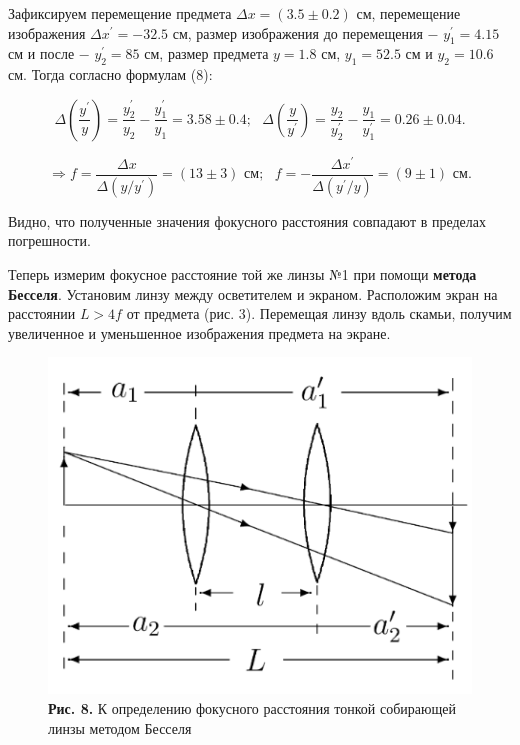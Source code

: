 \documentclass[a4paper,12pt]{article} %
\begin{document}
\hfill \break Зафиксируем перемещение предмета $\Delta x = (3.5 \pm 0.2)$ см, перемещение изображения $\Delta x^\prime = -32.5$ см, размер изображения до перемещения $-$ $y_{1}^\prime = 4.15$ см и после $-$ $y_{2}^\prime = 85$ см, размер предмета $y = 1.8$ см, $y_{1} = 52.5$ см и $y_{2} = 10.6$ см. Тогда согласно формулам (8):

$$
\Delta \left( \frac{y^\prime}{y} \right) = \frac{y_{2}^\prime}{y_{2}} - \frac {y_{1}^\prime} {y_{1}} = 3.58 \pm 0.4; \text{ } \Delta \left( \frac{y}{y^\prime} \right) = \frac{y_{2}}{y_{2}^\prime} - \frac {y_{1}} {y_{1}^\prime} = 0.26 \pm 0.04.
$$

\begin{equation}\label{ linkname }
\Rightarrow f = \frac {\Delta x} {\Delta \left( y / y^\prime \right)} = (13 \pm 3) \text{ см}; \text{ } f = - \frac {\Delta x^\prime} {\Delta \left( y^\prime / y \right)} = (9 \pm 1) \text{ см}.
\end{equation}
 
\hfill \break Видно, что полученные значения фокусного расстояния совпадают в пределах погрешности.

\hfill \break Теперь измерим фокусное расстояние той же линзы №1 при помощи \textbf{метода Бесселя}. Установим линзу между осветителем и экраном. Расположим экран на расстоянии $L > 4f$ от предмета (рис. 3). Перемещая линзу вдоль скамьи, получим увеличенное и уменьшенное изображения предмета на экране. 

\begin{figure}
\begin{center}
    \includegraphics[width=1\textwidth]{4.1.1_8.png}
    \textbf{Рис. 8.} К определению фокусного расстояния тонкой собирающей линзы методом Бесселя
\end{center}
\end{figure}
\end{document}
